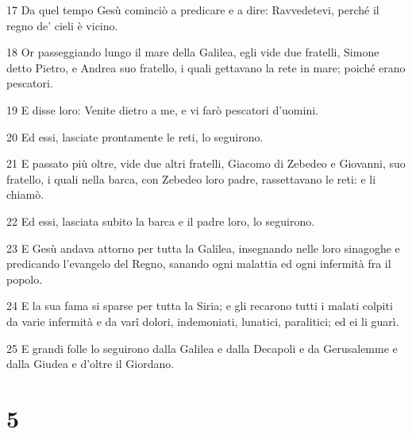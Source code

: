 \par 17 Da quel tempo Gesù cominciò a predicare e a dire: Ravvedetevi, perché il regno de' cieli è vicino.
\par 18 Or passeggiando lungo il mare della Galilea, egli vide due fratelli, Simone detto Pietro, e Andrea suo fratello, i quali gettavano la rete in mare; poiché erano pescatori.
\par 19 E disse loro: Venite dietro a me, e vi farò pescatori d'uomini.
\par 20 Ed essi, lasciate prontamente le reti, lo seguirono.
\par 21 E passato più oltre, vide due altri fratelli, Giacomo di Zebedeo e Giovanni, suo fratello, i quali nella barca, con Zebedeo loro padre, rassettavano le reti: e li chiamò.
\par 22 Ed essi, lasciata subito la barca e il padre loro, lo seguirono.
\par 23 E Gesù andava attorno per tutta la Galilea, insegnando nelle loro sinagoghe e predicando l'evangelo del Regno, sanando ogni malattia ed ogni infermità fra il popolo.
\par 24 E la sua fama si sparse per tutta la Siria; e gli recarono tutti i malati colpiti da varie infermità e da varî dolori, indemoniati, lunatici, paralitici; ed ei li guarì.
\par 25 E grandi folle lo seguirono dalla Galilea e dalla Decapoli e da Gerusalemme e dalla Giudea e d'oltre il Giordano.

\chapter{5}

